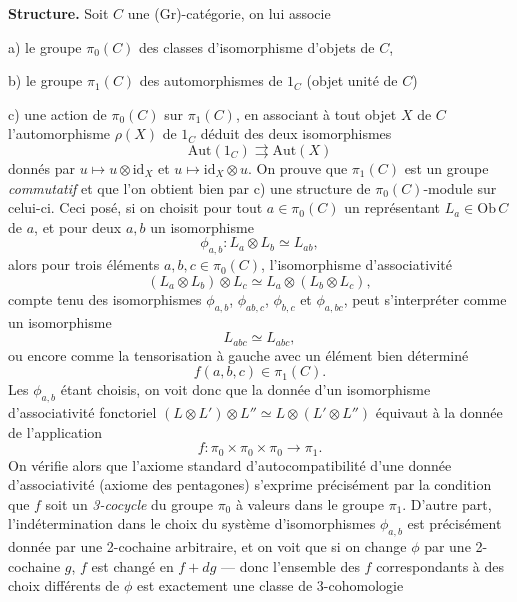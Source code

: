 \documentclass[11pt,a4paper]{article}
\begin{document}
\textbf{Structure.} Soit $C$ une (Gr)-catégorie, on lui associe

a) le groupe $\pi_{0}(C)$ des classes d'isomorphisme d'objets de $C$,

b) le groupe $\pi_{1}(C)$ des automorphismes de $1_{C}$ (objet unité de
$C$)

c) une action de $\pi_{0}(C)$ sur $\pi_{1}(C)$, en associant à tout objet
$X$ de $C$ l'automorphisme $\rho(X)$ de $1_{C}$ déduit des deux
isomorphismes
\[
\mathrm{Aut}(1_{C}) \rightrightarrows \mathrm{Aut}(X)
\]
donnés par $u \mapsto u \otimes \mathrm{id}_{X}$ et $u \mapsto
\mathrm{id}_{X} \otimes u$. On prouve que $\pi_{1}(C)$ est un groupe
\emph{commutatif} et que l'on obtient bien par c) une structure de
$\pi_{0}(C)$-module sur celui-ci. Ceci posé, si on choisit pour tout $a \in
\pi_{0}(C)$ un représentant $L_{a} \in \mathrm{Ob}\,C$ de $a$, et pour deux
 $a, b$ un isomorphisme
\[
\phi_{a,b} : L_{a} \otimes L_{b} \simeq L_{ab},
\]
alors pour trois éléments $a, b, c \in \pi_{0}(C)$, l'isomorphisme
d'associativité
\[
(L_{a} \otimes L_{b}) \otimes L_{c} \simeq L_{a} \otimes (L_{b} \otimes
L_{c}),
\]
compte tenu des isomorphismes $\phi_{a,b}$, $\phi_{ab,c}$, $\phi_{b,c}$ et
$\phi_{a,bc}$, peut s'interpréter comme un isomorphisme
\[
L_{abc} \simeq L_{abc},
\]
ou encore comme la tensorisation à gauche avec un élément bien déterminé
\[
f(a,b,c) \in \pi_{1}(C).
\]
Les $\phi_{a,b}$ étant choisis, on voit donc que la donnée d'un isomorphisme
d'associativité fonctoriel $(L \otimes L') \otimes L'' \simeq L \otimes (L'
\otimes L'')$ équivaut à la donnée de l'application
\[
f : \pi_{0} \times \pi_{0} \times \pi_{0} \longrightarrow \pi_{1}.
\]
On vérifie alors que l'axiome standard d'autocompatibilité d'une donnée
d'associativité (axiome des pentagones) s'exprime précisément par la
condition que $f$ soit un \emph{3-cocycle} du groupe $\pi_{0}$ à valeurs
dans le groupe $\pi_{1}$. D'autre part, l'indétermination dans le choix du
système d'isomorphismes $\phi_{a,b}$ est précisément donnée par une
2-cochaine arbitraire, et on voit que si on change $\phi$ par une 2-cochaine
$g$, $f$ est changé en $f + dg$ — donc l'ensemble des $f$ correspondants à
des choix différents de $\phi$ est exactement une classe de 3-cohomologie
\end{document}
